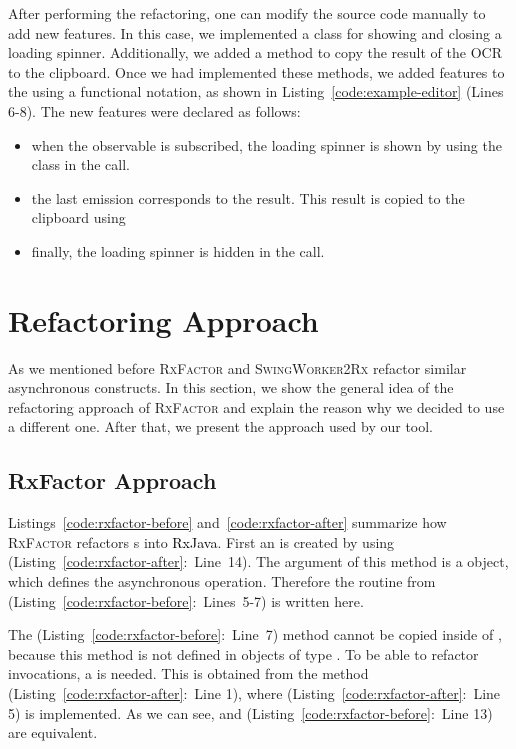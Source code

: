 \documentclass[type=bsc,accentcolor=tud9c]{tudthesis}
\newcommand{\framework}[1]{\textcolor{black}{#1}}
\newcommand{\toolextension}{\textsc{SwingWorker2Rx}}
\begin{document}


After performing the refactoring, one can modify the source code manually to add new features. In this case, we implemented a  class for showing and closing a loading spinner. Additionally, we added a method to copy the result of the OCR to the clipboard. Once we had implemented these methods, we added features to the  using a functional notation, as shown in Listing~\ref{code:example-editor} (Lines 6-8). The new features were declared as follows:
\begin{itemize}
	\item when the observable is subscribed, the loading spinner is shown by using the  class in the  call.
	\item the last emission corresponds to the result. This result is copied to the clipboard using 
	\item finally, the loading spinner is hidden in the  call.
\end{itemize}



\newpage
\section{Refactoring Approach}
As we mentioned before \textsc{RxFactor} and \toolextension{} refactor similar asynchronous constructs. In this section, we show the general idea of the refactoring approach of \textsc{RxFactor} and explain the reason why we decided to use a different one. After that, we present the approach used by our tool.

\subsection{RxFactor Approach}
Listings~\ref{code:rxfactor-before} and~\ref{code:rxfactor-after} summarize how \textsc{RxFactor} refactors s into \framework{RxJava}. First an  is created by using  (Listing~\ref{code:rxfactor-after}:~Line~14). The argument of this method is a  object, which defines the asynchronous operation. Therefore the routine from  (Listing~\ref{code:rxfactor-before}:~Lines~5-7) is written here. 

The  (Listing~\ref{code:rxfactor-before}:~Line~7) method cannot be copied inside of , because this method is not defined in objects of type . To be able to refactor  invocations, a  is needed. This  is obtained from the method  (Listing~\ref{code:rxfactor-after}:~Line 1), where  (Listing~\ref{code:rxfactor-after}:~Line 5) is implemented. As we can see,  and  (Listing~\ref{code:rxfactor-before}:~Line 13) are equivalent. 
\end{document}
